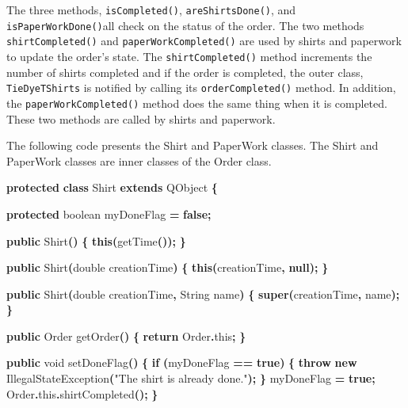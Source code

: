 \documentclass[
]{book}
\newenvironment{Shaded}{\begin{snugshade}}{\end{snugshade}}
\newcommand{\BuiltInTok}[1]{#1}
\newcommand{\ControlFlowTok}[1]{\textcolor[rgb]{0.13,0.29,0.53}{\textbf{#1}}}
\newcommand{\DataTypeTok}[1]{\textcolor[rgb]{0.13,0.29,0.53}{#1}}
\newcommand{\FunctionTok}[1]{\textcolor[rgb]{0.00,0.00,0.00}{#1}}
\newcommand{\KeywordTok}[1]{\textcolor[rgb]{0.13,0.29,0.53}{\textbf{#1}}}
\newcommand{\NormalTok}[1]{#1}
\newcommand{\OperatorTok}[1]{\textcolor[rgb]{0.81,0.36,0.00}{\textbf{#1}}}
\newcommand{\StringTok}[1]{\textcolor[rgb]{0.31,0.60,0.02}{#1}}
\theoremstyle{definition}
\theoremstyle{definition}
\theoremstyle{definition}
\theoremstyle{definition}
\theoremstyle{remark}
\begin{document}
The three methods, \texttt{isCompleted()},
\texttt{areShirtsDone()}, and \texttt{isPaperWorkDone()}all check on the status of the
order. The two methods \texttt{shirtCompleted()} and \texttt{paperWorkCompleted()} are
used by shirts and paperwork to update the order's state. The
\texttt{shirtCompleted()} method increments the number of shirts completed and if
the order is completed, the outer class, \texttt{TieDyeTShirts} is notified by
calling its \texttt{orderCompleted()} method. In addition, the
\texttt{paperWorkCompleted()} method does the same thing when it is completed.
These two methods are called by shirts and paperwork.

The following code presents the Shirt and PaperWork classes. The
Shirt and PaperWork classes are inner classes of the Order class.

\begin{Shaded}
\begin{Highlighting}[]
        \KeywordTok{protected} \KeywordTok{class}\NormalTok{ Shirt }\KeywordTok{extends}\NormalTok{ QObject }\OperatorTok{\{}

            \KeywordTok{protected} \DataTypeTok{boolean}\NormalTok{ myDoneFlag }\OperatorTok{=} \KeywordTok{false}\OperatorTok{;}

            \KeywordTok{public} \FunctionTok{Shirt}\OperatorTok{()} \OperatorTok{\{}
                \KeywordTok{this}\OperatorTok{(}\FunctionTok{getTime}\OperatorTok{());}
            \OperatorTok{\}}

            \KeywordTok{public} \FunctionTok{Shirt}\OperatorTok{(}\DataTypeTok{double}\NormalTok{ creationTime}\OperatorTok{)} \OperatorTok{\{}
                \KeywordTok{this}\OperatorTok{(}\NormalTok{creationTime}\OperatorTok{,} \KeywordTok{null}\OperatorTok{);}
            \OperatorTok{\}}

            \KeywordTok{public} \FunctionTok{Shirt}\OperatorTok{(}\DataTypeTok{double}\NormalTok{ creationTime}\OperatorTok{,} \BuiltInTok{String}\NormalTok{ name}\OperatorTok{)} \OperatorTok{\{}
                \KeywordTok{super}\OperatorTok{(}\NormalTok{creationTime}\OperatorTok{,}\NormalTok{ name}\OperatorTok{);}
            \OperatorTok{\}}

            \KeywordTok{public}\NormalTok{ Order }\FunctionTok{getOrder}\OperatorTok{()} \OperatorTok{\{}
                \ControlFlowTok{return}\NormalTok{ Order}\OperatorTok{.}\FunctionTok{this}\OperatorTok{;}
            \OperatorTok{\}}

            \KeywordTok{public} \DataTypeTok{void} \FunctionTok{setDoneFlag}\OperatorTok{()} \OperatorTok{\{}
                \ControlFlowTok{if} \OperatorTok{(}\NormalTok{myDoneFlag }\OperatorTok{==} \KeywordTok{true}\OperatorTok{)} \OperatorTok{\{}
                    \ControlFlowTok{throw} \KeywordTok{new} \BuiltInTok{IllegalStateException}\OperatorTok{(}\StringTok{"The shirt is already done."}\OperatorTok{);}
                \OperatorTok{\}}
\NormalTok{                myDoneFlag }\OperatorTok{=} \KeywordTok{true}\OperatorTok{;}
\NormalTok{                Order}\OperatorTok{.}\FunctionTok{this}\OperatorTok{.}\FunctionTok{shirtCompleted}\OperatorTok{();}
            \OperatorTok{\}}


\end{Highlighting}
\end{Shaded}
\end{document}
